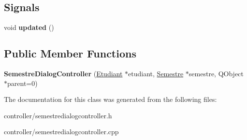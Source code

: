 \subsection*{Signals}
\begin{DoxyCompactItemize}
\item 
\hypertarget{classSemestreDialogController_a42eebeffab549104cfc7c3e34b579344}{void {\bfseries updated} ()}\label{classSemestreDialogController_a42eebeffab549104cfc7c3e34b579344}

\end{DoxyCompactItemize}
\subsection*{Public Member Functions}
\begin{DoxyCompactItemize}
\item 
\hypertarget{classSemestreDialogController_adf3bc854ee99e2701a186f599a632cb6}{{\bfseries Semestre\+Dialog\+Controller} (\hyperlink{classEtudiant}{Etudiant} $\ast$etudiant, \hyperlink{classSemestre}{Semestre} $\ast$semestre, Q\+Object $\ast$parent=0)}\label{classSemestreDialogController_adf3bc854ee99e2701a186f599a632cb6}

\end{DoxyCompactItemize}


The documentation for this class was generated from the following files\+:\begin{DoxyCompactItemize}
\item 
controller/semestredialogcontroller.\+h\item 
controller/semestredialogcontroller.\+cpp\end{DoxyCompactItemize}
